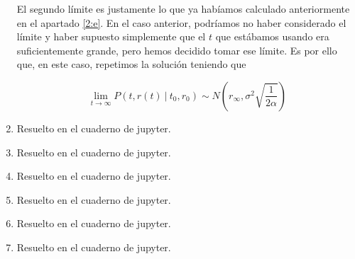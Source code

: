 \documentclass[a4paper]{article}
\begin{document}
\begin{enumerate}[label=(\alph*)]
        El segundo límite es justamente lo que ya habíamos calculado anteriormente en el apartado \ref{2:e}. En el caso anterior, podríamos no haber considerado el límite y haber supuesto simplemente que el $t$ que estábamos usando era suficientemente grande, pero hemos decidido tomar ese límite. Es por ello que, en este caso, repetimos la solución teniendo que

          \[
        \lim_{t\to \infty} P(t,r(t)\ | \ t_{0}, r_{0}) \sim N\left(r_{\infty}, \sigma^{2}\sqrt{\frac{1}{2\alpha}}\right)
        \]
  \item Resuelto en el cuaderno de jupyter.

  \item Resuelto en el cuaderno de jupyter.

  \item Resuelto en el cuaderno de jupyter.

  \item Resuelto en el cuaderno de jupyter.
  \item Resuelto en el cuaderno de jupyter.
  \item Resuelto en el cuaderno de jupyter.

\end{enumerate}
\end{document}
